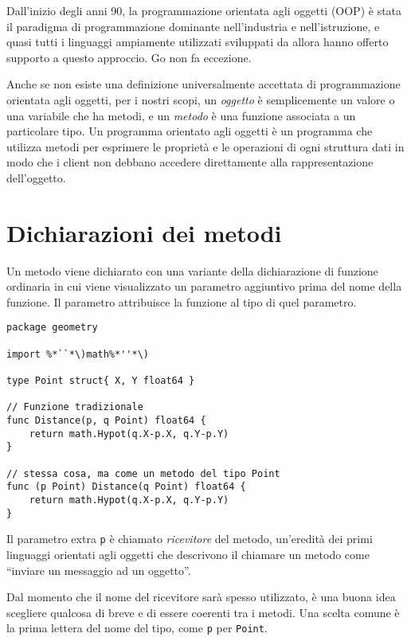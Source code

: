 Dall'inizio degli anni 90, la programmazione orientata agli oggetti (OOP) è stata il paradigma di programmazione dominante nell'industria e nell'istruzione, e quasi tutti i linguaggi ampiamente utilizzati sviluppati da allora hanno offerto supporto a questo approccio.
Go non fa eccezione.

Anche se non esiste una definizione universalmente accettata di programmazione orientata agli oggetti, per i nostri scopi, un \textit{oggetto} è semplicemente un valore o una variabile che ha metodi, e un \textit{metodo} è una funzione associata a un particolare tipo.
Un programma orientato agli oggetti è un programma che utilizza metodi per esprimere le proprietà e le operazioni di ogni struttura dati in modo che i client non debbano accedere direttamente alla rappresentazione dell'oggetto.


\section{Dichiarazioni dei metodi}
\label{sec:dichiarazioni_dei_metodi}%
Un metodo viene dichiarato con una variante della dichiarazione di funzione ordinaria in cui viene visualizzato un parametro aggiuntivo prima del nome della funzione.
Il parametro attribuisce la funzione al tipo di quel parametro.
\begin{lstlisting}[frame=single, label={lst:lstlisting5-1.1}]
package geometry

import %*``*\)math%*''*\)

type Point struct{ X, Y float64 }

// Funzione tradizionale
func Distance(p, q Point) float64 {
    return math.Hypot(q.X-p.X, q.Y-p.Y)
}

// stessa cosa, ma come un metodo del tipo Point
func (p Point) Distance(q Point) float64 {
    return math.Hypot(q.X-p.X, q.Y-p.Y)
}
\end{lstlisting}
Il parametro extra \verb|p| è chiamato \textit{ricevitore} del metodo, un'eredità dei primi linguaggi orientati agli oggetti che descrivono il chiamare un metodo come ``inviare un messaggio ad un oggetto''.

Dal momento che il nome del ricevitore sarà spesso utilizzato, è una buona idea scegliere qualcosa di breve e di essere coerenti tra i metodi.
Una scelta comune è la prima lettera del nome del tipo, come \verb|p| per \verb|Point|.

